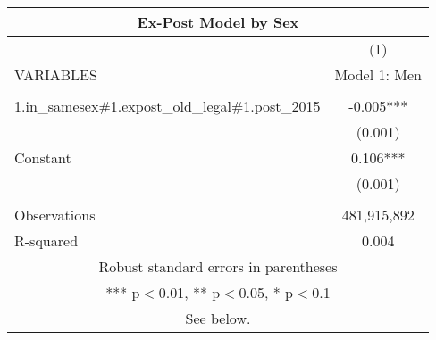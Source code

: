 \begin{tabular}{lc}
\multicolumn{2}{c}{Ex-Post Model by Sex} \\ \hline
 & (1) \\
VARIABLES & Model 1: Men \\ \hline
 &  \\
1.in\_samesex\#1.expost\_old\_legal\#1.post\_2015 & -0.005*** \\
 & (0.001) \\
Constant & 0.106*** \\
 & (0.001) \\
 &  \\
Observations & 481,915,892 \\
 R-squared & 0.004 \\ \hline
\multicolumn{2}{c}{ Robust standard errors in parentheses} \\
\multicolumn{2}{c}{ *** p$<$0.01, ** p$<$0.05, * p$<$0.1} \\
\multicolumn{2}{c}{ See below.} \\
\end{tabular}

